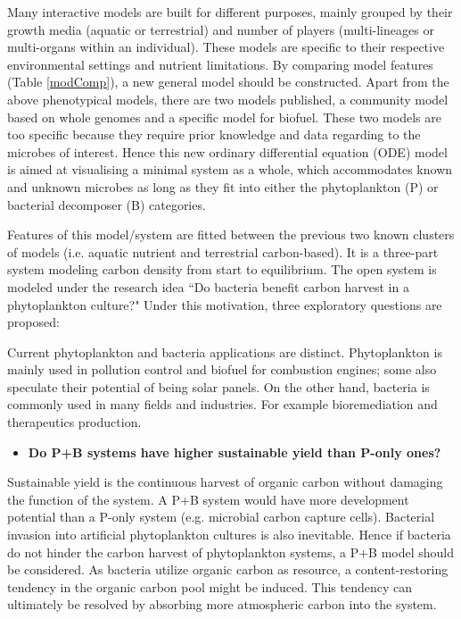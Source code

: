 \documentclass[../thesis.tex]{subfiles} %
\begin{document}
Many interactive models are built for different purposes, mainly grouped by their growth media (aquatic or terrestrial) and number of players (multi-lineages or multi-organs within an individual).  These models are specific to their respective environmental settings and nutrient limitations.  By comparing model features (Table \ref{modComp}), a new general model should be constructed.  Apart from the above phenotypical models, there are two models published, a community model based on whole genomes\autocite{harcombe2014metabolic} and a specific model for biofuel\autocite{kirthiga2014mathematical}.  These two models are too specific because they require prior knowledge and data regarding to the microbes of interest.  Hence this new ordinary differential equation (ODE) model is aimed at visualising a minimal system as a whole, which accommodates known and unknown microbes as long as they fit into either the phytoplankton (P) or bacterial decomposer (B) categories.

Features of this model/system are fitted between the previous two known clusters of models (i.e. aquatic nutrient and terrestrial carbon-based).  It is a three-part system modeling carbon density from start to equilibrium.  The open system is modeled under the research idea ``Do bacteria benefit carbon harvest in a phytoplankton culture?"  Under this motivation, three exploratory questions are proposed:

Current phytoplankton and bacteria applications are distinct.  Phytoplankton is mainly used in pollution control\autocite{evanson_2019,mcginn2011integration,rawat2011dual} and biofuel for combustion engines\autocite{mcginn2011integration,rawat2011dual}; some also speculate their potential of being solar panels.\autocite{sawa2017electricity,joshi2018bacterial}  On the other hand, bacteria is commonly used in many fields and industries.  For example bioremediation\autocite{dash2013marine,naik2013lead} and therapeutics production.\autocite{}

\begin{itemize}
    \item \textbf{
    Do P+B systems have higher sustainable yield than P-only ones?
    }
\end{itemize}

Sustainable yield is the continuous harvest of organic carbon without damaging the function of the system.  
A P+B system would have more development potential than a P-only system (e.g. microbial carbon capture cells).  Bacterial invasion into artificial phytoplankton cultures is also inevitable.  Hence if bacteria do not hinder the carbon harvest of phytoplankton systems, a P+B model should be considered.  As bacteria utilize organic carbon as resource, a content-restoring tendency in the organic carbon pool might be induced.  This tendency can ultimately be resolved by absorbing more atmospheric carbon into the system.
\end{document}
